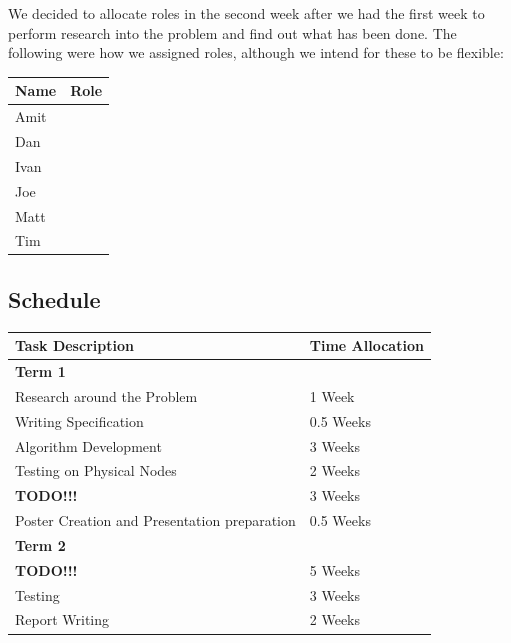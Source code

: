 \documentclass[a4paper]{article}
\begin{document}
We decided to allocate roles in the second week after we had the first week to perform research into the problem and find out what has been done. The following were how we assigned roles, although we intend for these to be flexible:

\begin{table}[H]
	\centering
	\begin{tabular}{| l | l |}
	Name & Role \\
	\hline
	Amit & ~ \\
	Dan & ~ \\
	Ivan & ~ \\
	Joe & ~ \\
	Matt & ~ \\
	Tim & ~ \\
	\end{tabular}
\end{table}


\subsection{Schedule}


\begin{table}[H]
	\centering
	\begin{tabular}{| l | l |}
	Task Description & Time Allocation \\
	\hline
	\hline
	\multicolumn{2}{|l|}{\textbf{Term 1}} \\
	\hline

	Research around the Problem & 1 Week \\
	Writing Specification & 0.5 Weeks \\
	Algorithm Development & 3 Weeks \\
	Testing on Physical Nodes & 2 Weeks \\

	\textbf{TODO!!!} & 3 Weeks \\

	Poster Creation and Presentation preparation & 0.5 Weeks \\

	\hline
	\hline
	\multicolumn{2}{|l|}{\textbf{Term 2}} \\
	\hline

	\textbf{TODO!!!} & 5 Weeks \\

	Testing & 3 Weeks \\
	Report Writing & 2 Weeks \\
	
	\end{tabular}
\end{table}
\end{document}
